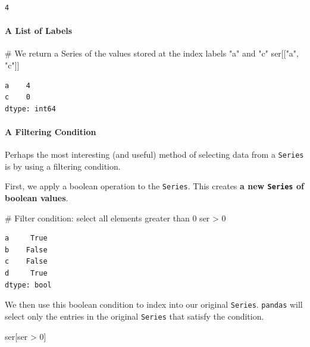 \documentclass[
  letterpaper,
  DIV=11,
  numbers=noendperiod]{scrreprt}
\let\oldparagraph\paragraph
\renewcommand{\paragraph}[1]{\oldparagraph{#1}\mbox{}}
\newenvironment{Shaded}{\begin{snugshade}}{\end{snugshade}}
\newcommand{\CommentTok}[1]{\textcolor[rgb]{0.37,0.37,0.37}{#1}}
\newcommand{\DecValTok}[1]{\textcolor[rgb]{0.68,0.00,0.00}{#1}}
\newcommand{\NormalTok}[1]{\textcolor[rgb]{0.00,0.23,0.31}{#1}}
\newcommand{\OperatorTok}[1]{\textcolor[rgb]{0.37,0.37,0.37}{#1}}
\newcommand{\StringTok}[1]{\textcolor[rgb]{0.13,0.47,0.30}{#1}}
\begin{document}
\begin{verbatim}
4
\end{verbatim}

\paragraph{A List of Labels}\label{a-list-of-labels}

\begin{Shaded}
\begin{Highlighting}[]
\CommentTok{\# We return a Series of the values stored at the index labels "a" and "c"}
\NormalTok{ser[[}\StringTok{"a"}\NormalTok{, }\StringTok{"c"}\NormalTok{]] }
\end{Highlighting}
\end{Shaded}

\begin{verbatim}
a    4
c    0
dtype: int64
\end{verbatim}

\paragraph{A Filtering Condition}\label{a-filtering-condition}

Perhaps the most interesting (and useful) method of selecting data from
a \texttt{Series} is by using a filtering condition.

First, we apply a boolean operation to the \texttt{Series}. This creates
\textbf{a new \texttt{Series} of boolean values}.

\begin{Shaded}
\begin{Highlighting}[]
\CommentTok{\# Filter condition: select all elements greater than 0}
\NormalTok{ser }\OperatorTok{\textgreater{}} \DecValTok{0} 
\end{Highlighting}
\end{Shaded}

\begin{verbatim}
a     True
b    False
c    False
d     True
dtype: bool
\end{verbatim}

We then use this boolean condition to index into our original
\texttt{Series}. \texttt{pandas} will select only the entries in the
original \texttt{Series} that satisfy the condition.

\begin{Shaded}
\begin{Highlighting}[]
\NormalTok{ser[ser }\OperatorTok{\textgreater{}} \DecValTok{0}\NormalTok{] }
\end{Highlighting}
\end{Shaded}
\end{document}
